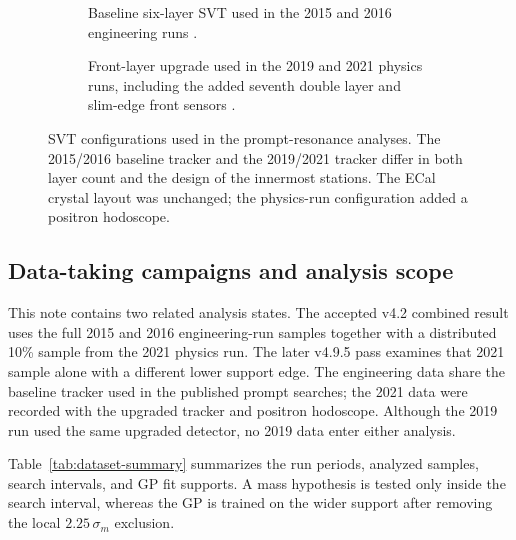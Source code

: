 \begin{figure}[H]
\centering
\begin{subfigure}[t]{0.90\linewidth}
  \centering
  \caption{Baseline six-layer SVT used in the 2015 and 2016 engineering runs
  \cite{HPS2016BumpInternal}.}
\end{subfigure}

\vspace{0.9em}

\begin{subfigure}[t]{0.78\linewidth}
  \centering
  \caption{Front-layer upgrade used in the 2019 and 2021 physics runs, including the
  added seventh double layer and slim-edge front sensors
  \cite{HPSExperiment2022,HPSSlimEdgeSensors2020}.}
\end{subfigure}
\caption{SVT configurations used in the prompt-resonance analyses. The 2015/2016
baseline tracker and the 2019/2021 tracker differ in both layer count and the design
of the innermost stations. The ECal crystal layout was unchanged; the physics-run
configuration added a positron hodoscope.}
\label{fig:hps-svt-eras}
\end{figure}

\subsection{Data-taking campaigns and analysis scope}

This note contains two related analysis states. The accepted v4.2 combined result uses
the full 2015 and 2016 engineering-run samples together with a distributed 10\% sample
from the 2021 physics run. The later v4.9.5 pass examines that 2021 sample alone with a
different lower support edge. The engineering data share the baseline tracker used in
the published prompt searches; the 2021 data were recorded with the upgraded tracker
and positron hodoscope. Although the 2019 run used the same upgraded detector, no 2019
data enter either analysis.

Table~\ref{tab:dataset-summary} summarizes the run periods, analyzed samples, search
intervals, and GP fit supports. A mass hypothesis is tested only inside the search
interval, whereas the GP is trained on the wider support after removing the local
$2.25\,\sigma_m$ exclusion.

